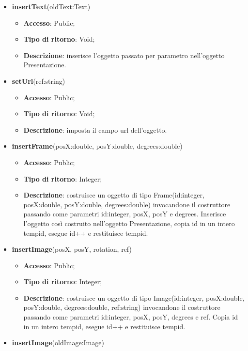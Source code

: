 {{\begin{itemize}
\begin{itemize}
			\end{itemize}
			\item \textbf{insertText}(oldText:Text)
			\begin{itemize}
				\item \textbf{Accesso}: Public;
				\item \textbf{Tipo di ritorno}: Void;
				\item \textbf{Descrizione}: inserisce l’oggetto passato per parametro nell’oggetto Presentazione.
			\end{itemize}
			\item \textbf{setUrl}(ref:string)
			\begin{itemize}
				\item \textbf{Accesso}: Public;
				\item \textbf{Tipo di ritorno}: Void;
				\item \textbf{Descrizione}: imposta il campo url dell’oggetto.
			\end{itemize}
			\item \textbf{insertFrame}(posX:double, posY:double, degrees:double)
			\begin{itemize}
				\item \textbf{Accesso}: Public;
				\item \textbf{Tipo di ritorno}: Integer;
				\item \textbf{Descrizione}: costruisce un oggetto di tipo Frame(id:integer, posX:double, posY:double, degrees:double) invocandone il costruttore passando come parametri id:integer, posX, posY e degrees. Inserisce l’oggetto così costruito nell’oggetto Presentazione, copia id in un intero tempid, esegue id++ e restituisce tempid.
			\end{itemize}
			\item \textbf{insertImage}(posX, posY, rotation, ref)
			\begin{itemize}
				\item \textbf{Accesso}: Public;
				\item \textbf{Tipo di ritorno}: Integer;
				\item \textbf{Descrizione}: costruisce un oggetto di tipo Image(id:integer, posX:double, posY:double, degrees:double, ref:string) invocandone il costruttore passando come parametri id:integer, posX, posY, degrees e ref. Copia id in un intero tempid, esegue id++ e restituisce tempid.
			\end{itemize}
			\item \textbf{insertImage}(oldImage:Image)
			\begin{itemize}

\end{itemize}
\end{itemize}}}
